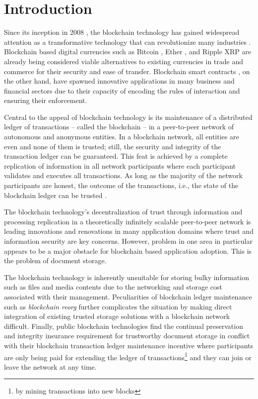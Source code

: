 \section{Introduction}
\label{s-intro}
Since its inception in 2008 \cite{bitcoin}, the blockchain technology has gained widespread attention as a transformative technology that can revolutionize many industries \cite{deloitte}. Blockchain based digital currencies such as Bitcoin \cite{bitcoin}, Ether \cite{Wood2014EthereumAS}, and Ripple XRP \cite{David2014TheRP} are already being considered viable alternatives to existing currencies in trade and commerce for their security and ease of transfer. Blockchain smart contracts \cite{FM548} \cite{Wood2014EthereumAS}, on the other hand, have spawned innovative applications in many business and financial sectors due to their capacity of encoding the rules of interaction and ensuring their enforcement.

Central to the appeal of blockchain technology is its maintenance of a distributed ledger of transactions --  called the blockchain -- in a peer-to-peer network of autonomous and anonymous entities. In a blockchain network, all entities are even and none of them is trusted; still, the security and integrity of the transaction ledger can be guaranteed. This feat is achieved by a complete replication of information in all network participants where each participant validates and executes all transactions. As long as the majority of the network participants are honest, the outcome of the transactions, i.e., the state of the blockchain ledger can be trusted \cite{10.1007/978-3-319-56614-6_22}.

The blockchain technology's decentralization of trust through information and processing replication in a theoretically infinitely scalable peer-to-peer network is leading innovations and renovations in many application domains where trust and information security are key concerns. However, problem in one area in particular appears to be a major obstacle for blockchain based application adoption. This is the problem of document storage. 

The blockchain technology is inherently unsuitable for storing bulky information such as files and media contents due to the networking and storage cost associated with their management. Peculiarities of blockchain ledger maintenance such as \textit{blockchain reorg} \cite{reorg} further complicates the situation by making direct integration of existing trusted storage solutions with a blockchain network difficult. Finally, public blockchain technologies find the continual preservation and integrity insurance requirement for trustworthy document storage in conflict with their blockchain transaction ledger maintenance incentive where participants are only being paid for extending the ledger of transactions\footnote{by mining transactions into new blocks} and they can join or leave the network at any time.      

